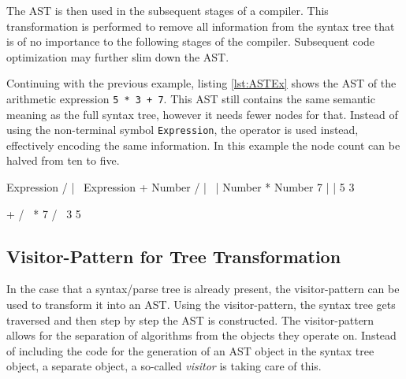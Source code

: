 The AST is then used in the subsequent stages of a compiler. This transformation is performed to remove all information from the syntax tree that is of no importance to the following stages of the compiler. Subsequent code optimization may further slim down the AST. 

Continuing with the previous example, listing \ref{lst:ASTEx} shows the AST of the arithmetic expression \texttt{5 * 3 + 7}. This AST still contains the same semantic meaning as the full syntax tree, however it needs fewer nodes for that. Instead of using the non-terminal symbol \texttt{Expression}, the operator is used instead, effectively encoding the same information. In this example the node count can be halved from ten to five.

\begin{GenericCode}[float,numbers=none,caption=Syntax tree of the arithmetic expression \texttt{5 * 3 + 7}., label=lst:SyntaxTreeEx]
                                   Expression
                                  /     |    \
                            Expression  +    Number
                           /    |    \         |    
                        Number  *  Number      7
                          |          | 
                          5          3   
\end{GenericCode}

\begin{GenericCode}[float,numbers=none,caption=Abstract syntax tree of the arithmetic expression \texttt{5 * 3 + 7}., label=lst:ASTEx]
                                      +
                                    /   \
                                   *     7
                                 /   \
                                3     5
\end{GenericCode}

\subsection{Visitor-Pattern for Tree Transformation}

In the case that a syntax/parse tree is already present, the visitor-pattern can be used to transform it into an AST. Using the visitor-pattern, the syntax tree gets traversed and then step by step the AST is constructed. The visitor-pattern allows for the separation of algorithms from the objects they operate on. Instead of including the code for the generation of an AST object in the syntax tree object, a separate object, a so-called \textit{visitor} is taking care of this. 

